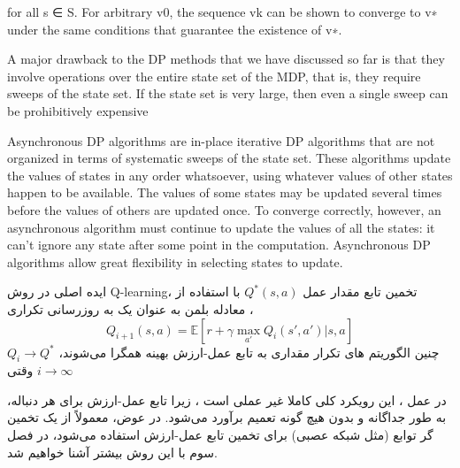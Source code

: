 for all s ∈ S. For arbitrary v0, the sequence {vk} can be shown to converge to v∗ under the same
conditions that guarantee the existence of v∗.



A major drawback to the DP methods that we have discussed so far is that they involve operations
over the entire state set of the MDP, that is, they require sweeps of the state set. If the state set is very
large, then even a single sweep can be prohibitively expensive


Asynchronous DP algorithms are in-place iterative DP algorithms that are not organized in terms
of systematic sweeps of the state set. These algorithms update the values of states in any order
whatsoever, using whatever values of other states happen to be available. The values of some states
may be updated several times before the values of others are updated once. To converge correctly,
however, an asynchronous algorithm must continue to update the values of all the states: it can’t ignore
any state after some point in the computation. Asynchronous DP algorithms allow great flexibility in
selecting states to update.

ایده اصلی در روش Q-learning، تخمین تابع مقدار عمل  
$Q^*(s,a)$ 
با استفاده از معادله بلمن به عنوان یک به روزرسانی تکراری ،
$$Q_{i+1}(s,a) = \mathbb{E}[r+ \gamma \max_{a'} Q_i(s',a')|s,a]$$
چنین الگوریتم های تکرار مقداری به تابع عمل-ارزش بهینه همگرا می‌شوند، 
$Q_i \longrightarrow Q^*$
وقتی
$i \longrightarrow \infty$

در عمل ، این رویکرد کلی کاملا غیر عملی است ،
زیرا تابع عمل-ارزش برای هر دنباله، به طور جداگانه و بدون هیچ گونه تعمیم برآورد می‌شود. در عوض، معمولاً از یک تخمین گر توابع (مثل شبکه عصبی) برای تخمین تابع عمل-ارزش استفاده می‌شود، در فصل سوم با این روش بیشتر آشنا خواهیم شد.